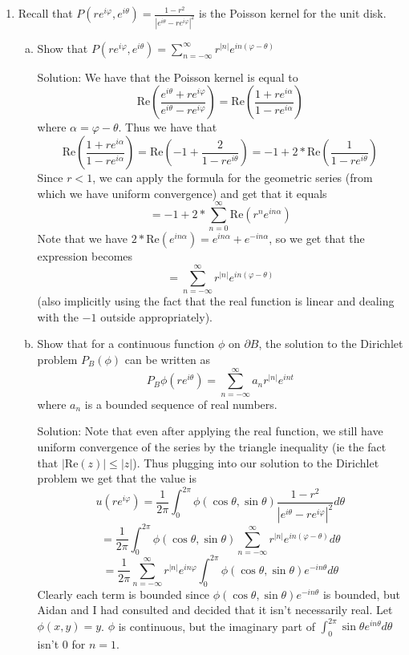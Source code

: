 \documentclass[11pt]{article}
\newcommand{\re}[0]{\text{Re}}
\begin{document}
\begin{enumerate}[(1)]
\item Recall that $P(re^{i\varphi}, e^{i\theta}) = \frac{1 - r^2}{|e^{i\theta} - re^{i\varphi}|^2}$ is the Poisson kernel for the unit disk.

\begin{enumerate}[(a)]
\item Show that $P(re^{i\varphi}, e^{i\theta}) = \sum_{n=-\infty}^{\infty} r^{|n|}e^{in(\varphi - \theta)}$

Solution: We have that the Poisson kernel is equal to 
$$ \re\left( \frac{e^{i\theta} + re^{i\varphi}}{e^{i\theta} - re^{i\varphi}}\right) = \re \left( \frac{1+ re^{i\alpha}}{1- re^{i\alpha}}\right) $$
where $\alpha = \varphi - \theta$. Thus we have that 
$$ \re \left( \frac{1+ re^{i\alpha}}{1- re^{i\alpha}}\right) = \re\left(-1 + \frac{2}{1 - re^{i\theta}}\right) = -1 + 2 * \re\left(\frac{1}{1- re^{i\theta}}\right)$$
Since $r < 1$, we can apply the formula for the geometric series (from which we have uniform convergence) and get that it equals 
$$ = - 1 + 2 * \sum_{n=0}^{\infty} \re(r^{n}e^{in\alpha}) $$
Note that we have $2 * \re(e^{in\alpha}) = e^{in\alpha} + e^{-in\alpha}$, so we get that the expression becomes 
$$ = \sum_{n=-\infty}^\infty r^{|n|}e^{in(\varphi - \theta)} $$
(also implicitly using the fact that the real function is linear and dealing with the $-1$ outside appropriately). 

\item Show that for a continuous function $\phi$ on $\partial B$, the solution to the Dirichlet problem $P_B(\phi)$ can be written as 
$$ P_B\phi(re^{i\theta}) = \sum_{n=-\infty}^{\infty} a_nr^{|n|}e^{int}$$
where $a_n$ is a bounded sequence of real numbers.

Solution: Note that even after applying the real function, we still have uniform convergence of the series by the triangle inequality (ie the fact that $|\re(z)| \leq |z|$). Thus plugging into our solution to the Dirichlet problem we get that the value is 
$$ u(re^{i\varphi}) = \frac{1}{2\pi} \int_0^{2\pi} \phi(\cos \theta, \sin \theta) \frac{1-r^2}{|e^{i\theta} - re^{i\varphi}|^2} d\theta $$
$$ = \frac{1}{2\pi}\int_0^{2\pi} \phi(\cos \theta, \sin \theta) \sum_{n=-\infty}^{\infty} r^{|n|}e^{in(\varphi - \theta)}d\theta $$
$$ = \frac{1}{2\pi} \sum_{n=-\infty}^{\infty} r^{|n|}e^{in\varphi} \int_0^{2\pi} \phi(\cos \theta, \sin \theta) e^{-in \theta} d\theta $$
Clearly each term is bounded since $\phi(\cos \theta, \sin \theta)e^{-in \theta}$ is bounded, but Aidan and I had consulted and decided that it isn't necessarily real. Let $\phi(x,y) = y$. $\phi$ is continuous, but the imaginary part of $\int_0^{2\pi} \sin \theta e^{in\theta}d\theta$ isn't $0$ for $n = 1$. 


\end{enumerate}
\end{enumerate}
\end{document}
